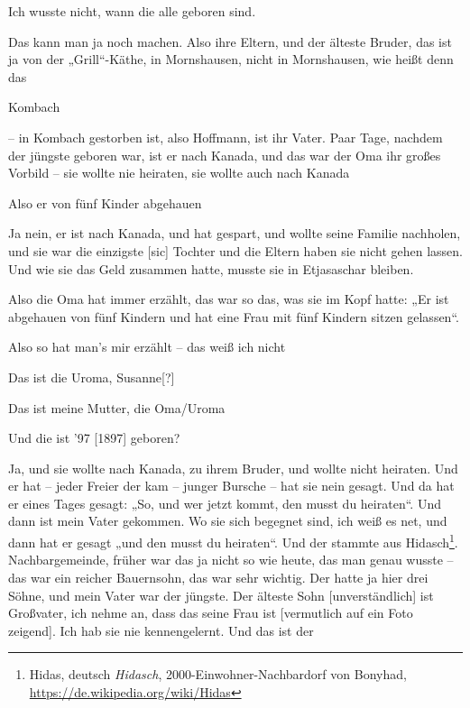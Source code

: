 \documentclass[ngerman,]{article}
\providecommand{\tightlist}{%
  \setlength{\itemsep}{0pt}\setlength{\parskip}{0pt}}
\begin{document}
\begin{multicols}{3}
\begin{description}
\tightlist
\item[Ruth]
Ich wusste nicht, wann die alle geboren sind.
\item[Käthe]
Das kann man ja noch machen. Also ihre Eltern, und der älteste Bruder,
das ist ja von der „Grill“-Käthe, in Mornshausen, nicht in Mornshausen,
wie heißt denn das
\item[Ruth]
Kombach
\item[Käthe]
– in Kombach gestorben ist, also Hoffmann, ist ihr Vater. Paar Tage,
nachdem der jüngste geboren war, ist er nach Kanada, und das war der Oma
ihr großes Vorbild – sie wollte nie heiraten, sie wollte auch nach
Kanada
\item[Ruth]
Also er von fünf Kinder abgehauen
\item[Käthe]
Ja nein, er ist nach Kanada, und hat gespart, und wollte seine Familie
nachholen, und sie war die einzigste {[}sic{]} Tochter und die Eltern
haben sie nicht gehen lassen. Und wie sie das Geld zusammen hatte,
musste sie in Etjasaschar bleiben.
\item[Ruth]
Also die Oma hat immer erzählt, das war so das, was sie im Kopf hatte:
„Er ist abgehauen von fünf Kindern und hat eine Frau mit fünf Kindern
sitzen gelassen“.
\item[Käthe]
Also so hat man's mir erzählt – das weiß ich nicht
\item[Ruth]
Das ist die Uroma, Susanne{[}?{]}
\item[Käthe]
Das ist meine Mutter, die Oma/Uroma
\item[Ruth]
Und die ist '97 {[}1897{]} geboren?
\item[Käthe]
Ja, und sie wollte nach Kanada, zu ihrem Bruder, und wollte nicht
heiraten. Und er hat – jeder Freier der kam – junger Bursche – hat sie
nein gesagt. Und da hat er eines Tages gesagt: „So, und wer jetzt kommt,
den musst du heiraten“. Und dann ist mein Vater gekommen. Wo sie sich
begegnet sind, ich weiß es net, und dann hat er gesagt „und den musst du
heiraten“. Und der stammte aus Hidasch\footnote{Hidas, deutsch
  \emph{Hidasch}, 2000-Einwohner-Nachbardorf von Bonyhad,
  \url{https://de.wikipedia.org/wiki/Hidas}}. Nachbargemeinde, früher
war das ja nicht so wie heute, das man genau wusste – das war ein
reicher Bauernsohn, das war sehr wichtig. Der hatte ja hier drei Söhne,
und mein Vater war der jüngste. Der älteste Sohn {[}unverständlich{]}
ist Großvater, ich nehme an, dass das seine Frau ist {[}vermutlich auf
ein Foto zeigend{]}. Ich hab sie nie kennengelernt. Und das ist der

\end{description}
\end{multicols}
\end{document}
